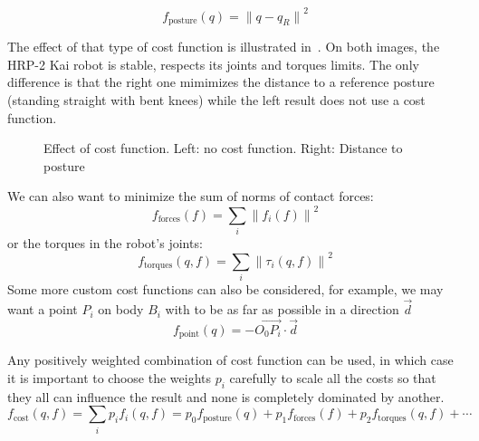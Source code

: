 \begin{equation*}
  f_\text{posture}(q) = {\|q-q_R\|}^2
\end{equation*}

The effect of that type of cost function is illustrated in~.
On both images, the HRP-2 Kai robot is stable, respects its joints and torques limits.
The only difference is that the right one mimimizes the distance to a reference posture (standing straight with bent knees) while the left result does not use a cost function.

\begin{figure}[htpb]
  \centering
  \setlength{\fboxsep}{0pt}%
  \setlength{\fboxrule}{1pt}%
  \caption{Effect of cost function. Left: no cost function. Right: Distance to posture}
\label{fig:cost}
\end{figure}

We can also want to minimize the sum of norms of contact forces:
\begin{equation*}
  f_\text{forces}(f) = \sum\limits_i {\|f_i(f)\|}^2
\end{equation*}
or the torques in the robot's joints:
\begin{equation*}
  f_\text{torques}(q,f) = \sum\limits_i {\|\tau_i(q,f)\|}^2
\end{equation*}
Some more custom cost functions can also be considered, for example, we may want a point $P_i$ on body $B_i$ with to be as far as possible in a direction $\vec{d}$
\begin{equation*}
  f_\text{point} (q) = -{\overrightarrow{O_0 P_i}}\cdot{\vec{d}}
\end{equation*}

Any positively weighted combination of cost function can be used, in which case it is important to choose the weights $p_i$ carefully to scale all the costs so that they all can influence the result and none is completely dominated by another.
\begin{equation}
  f_\text{cost}(q,f) = \sum\limits_i{p_i f_i(q,f)} = p_0 f_\text{posture}(q) + p_1 f_\text{forces}(f) + p_2 f_\text{torques}(q,f) + \cdots
\end{equation}



